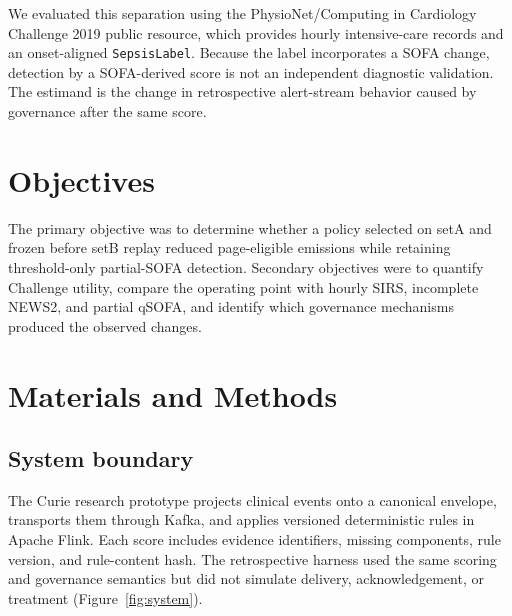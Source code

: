 \documentclass[11pt]{article}
\begin{document}
We evaluated this separation using the PhysioNet/Computing in Cardiology
Challenge 2019 public resource, which provides hourly intensive-care records
and an onset-aligned \texttt{SepsisLabel}.\citep{reyna2020ccm,reyna2019physionet}
Because the label incorporates a SOFA change, detection by a SOFA-derived score
is not an independent diagnostic validation. The estimand is the change in
retrospective alert-stream behavior caused by governance after the same score.

\section{Objectives}
The primary objective was to determine whether a policy selected on setA and
frozen before setB replay reduced page-eligible emissions while retaining
threshold-only partial-SOFA detection. Secondary objectives were to quantify
Challenge utility, compare the operating point with hourly SIRS, incomplete
NEWS2, and partial qSOFA, and identify which governance mechanisms produced the
observed changes.

\section{Materials and Methods}
\label{sec:methods}
\subsection{System boundary}
The Curie research prototype projects clinical events onto a canonical
envelope, transports them through Kafka, and applies versioned deterministic
rules in Apache Flink. Each score includes evidence identifiers, missing
components, rule version, and rule-content hash. The retrospective harness used
the same scoring and governance semantics but did not simulate delivery,
acknowledgement, or treatment (Figure~\ref{fig:system}).
\end{document}
